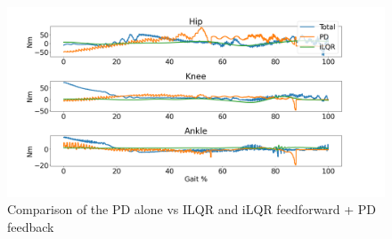 \begin{figure}[h!]
    \centering
    \includegraphics[scale=0.35]{images/controllers/torque_compare.png}
    \caption[Torque Comparison of the iLQR controller]{Comparison of the PD alone vs ILQR and iLQR feedforward + PD feedback}
    \label{fig:comparisonTorque}
\end{figure}


